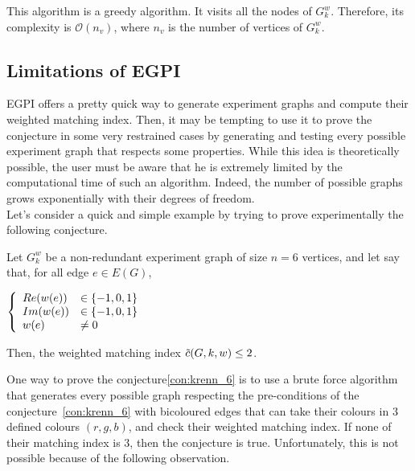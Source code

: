 \begin{enumerate}
        This algorithm is a greedy algorithm. It visits all the nodes of $G_k^w$.
        Therefore, its complexity is $\mathcal{O}(n_v)$, where $n_v$ is the number of vertices of $G_k^w$.

\end{enumerate}


\subsection{Limitations of EGPI}
\label{subsec:EGPI_limitations}

EGPI offers a pretty quick way to generate experiment graphs and compute their weighted matching index.
Then, it may be tempting to use it to prove the conjecture in some very restrained cases by generating and testing every possible experiment graph that respects some properties.
While this idea is theoretically possible, the user must be aware that he is extremely limited by the computational time of such an algorithm.
Indeed, the number of possible graphs grows exponentially with their degrees of freedom.\\

Let's consider a quick and simple example by trying to prove experimentally the following conjecture.

\begin{conjecture}
    \label{con:krenn_6}
    Let $G_k^w$ be a non-redundant experiment graph of size $n = 6$ vertices, and let say that, for all edge $e \in E(G)$,
    \begin{center}
        $\left\{\begin{array}{l l}
            Re(w(e)) & \in \{-1, 0, 1\} \\
            Im(w(e)) & \in \{-1, 0, 1\} \\
            w(e)     & \neq 0          \\
        \end{array}\right.$
    \end{center}
    Then, the weighted matching index $\Tilde{c}(G, k, w) \leq 2$.
\end{conjecture}

One way to prove the conjecture\ref{con:krenn_6} is to use a brute force algorithm that generates every possible graph respecting the pre-conditions of the conjecture~\ref{con:krenn_6} with bicoloured edges that can take their colours in $3$ defined colours $(r, g, b)$, and check their weighted matching index.
If none of their matching index is $3$, then the conjecture is true.
Unfortunately, this is not possible because of the following observation.\\

